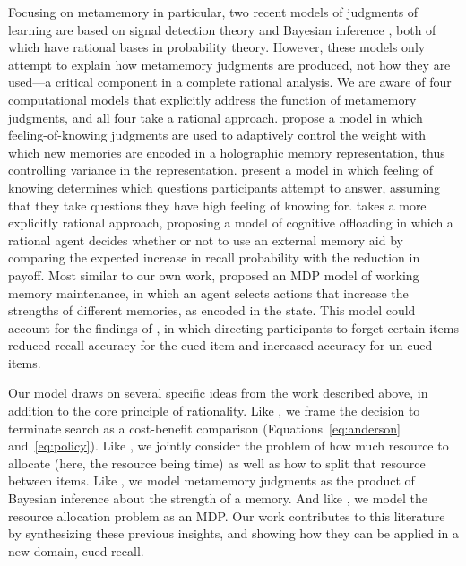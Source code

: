 Focusing on metamemory in particular, two recent models of judgments of learning are based on signal detection theory \citep{jang2012stochastic} and Bayesian inference \citep{hu2021bayesian}, both of which have rational bases in probability theory. However, these models only attempt to explain how metamemory judgments are produced, not how they are used---a critical component in a complete rational analysis. We are aware of four computational models that explicitly address the function of metamemory judgments, and all four take a rational approach. \citet{metcalfe1993novelty} propose a model in which feeling-of-knowing judgments are used to adaptively control the weight with which new memories are encoded in a holographic memory representation, thus controlling variance in the representation. \citet{bennett2017bayesian} present a model in which feeling of knowing determines which questions participants attempt to answer, assuming that they take questions they have high feeling of knowing for. \citet{hu2019role} takes a more explicitly rational approach, proposing a model of cognitive offloading in which a rational agent decides whether or not to use an external memory aid by comparing the expected increase in recall probability with the reduction in payoff. Most similar to our own work, \citet{suchow2016deciding} proposed an MDP model of working memory maintenance, in which an agent selects actions that increase the strengths of different memories, as encoded in the state. This model could account for the findings of \citet{williams2013benefit}, in which directing participants to forget certain items reduced recall accuracy for the cued item and increased accuracy for un-cued items.

Our model draws on several specific ideas from the work described above, in addition to the core principle of rationality. Like \citet{anderson1989human}, we frame the decision to terminate search as a cost-benefit comparison (Equations~\ref{eq:anderson} and~\ref{eq:policy}). Like \citet{vandenberg2018resourcerational}, we jointly consider the problem of how much resource to allocate (here, the resource being time) as well as how to split that resource between items. Like \citet{hu2021bayesian}, we model metamemory judgments as the product of Bayesian inference about the strength of a memory. And like \citet{suchow2016deciding}, we model the resource allocation problem as an MDP. Our work contributes to this literature by synthesizing these previous insights, and showing how they can be applied in a new domain, cued recall.

